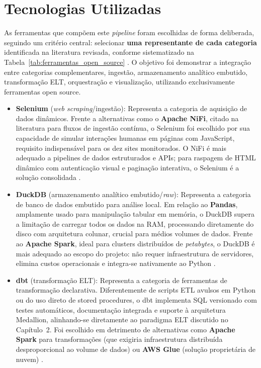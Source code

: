 \section{Tecnologias Utilizadas}

As ferramentas que compõem este \textit{pipeline} foram escolhidas de forma deliberada, seguindo um critério central: selecionar \textbf{uma representante de cada categoria} identificada na literatura revisada, conforme sistematizado na Tabela~\ref{tab:ferramentas_open_source} \cite{mbata2024survey}. O objetivo foi demonstrar a integração entre categorias complementares, ingestão, armazenamento analítico embutido, transformação ELT, orquestração e visualização, utilizando exclusivamente ferramentas open source.

\begin{itemize}
    \item \textbf{Selenium} (\textit{web scraping}/ingestão): Representa a categoria de aquisição de dados dinâmicos. Frente a alternativas como o \textbf{Apache NiFi}, citado na literatura para fluxos de ingestão contínua, o Selenium foi escolhido por sua capacidade de simular interações humanas em páginas com JavaScript, requisito indispensável para os dez sites monitorados. O NiFi é mais adequado a pipelines de dados estruturados e APIs; para raspagem de HTML dinâmico com autenticação visual e paginação interativa, o Selenium é a solução consolidada \cite{mbata2024survey}.

    \item \textbf{DuckDB} (armazenamento analítico embutido/\textit{raw}): Representa a categoria de banco de dados embutido para análise local. Em relação ao \textbf{Pandas}, amplamente usado para manipulação tabular em memória, o DuckDB supera a limitação de carregar todos os dados na RAM, processando diretamente do disco com arquitetura colunar, crucial para médios volumes de dados. Frente ao \textbf{Apache Spark}, ideal para clusters distribuídos de \textit{petabytes}, o DuckDB é mais adequado ao escopo do projeto: não requer infraestrutura de servidores, elimina custos operacionais e integra-se nativamente ao Python \cite{gargouri2026multi}.

    \item \textbf{dbt} (transformação ELT): Representa a categoria de ferramentas de transformação declarativa. Diferentemente de scripts ETL avulsos em Python ou do uso direto de stored procedures, o dbt implementa SQL versionado com testes automáticos, documentação integrada e suporte à arquitetura Medallion, alinhando-se diretamente ao paradigma ELT discutido no Capítulo~2. Foi escolhido em detrimento de alternativas como \textbf{Apache Spark} para transformações (que exigiria infraestrutura distribuída desproporcional ao volume de dados) ou \textbf{AWS Glue} (solução proprietária de nuvem) \cite{gargouri2026multi, mbata2024survey}.


\end{itemize}
